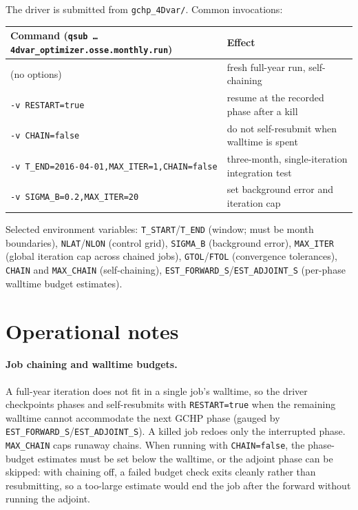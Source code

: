 \documentclass[11pt]{article}
\newcommand{\code}[1]{\texttt{#1}}
\begin{document}
The driver is submitted from \code{gchp\_4Dvar/}. Common invocations:

\begin{center}
\small
\begin{longtable}{@{}p{}p{}@{}}
\toprule
Command (\code{qsub \dots 4dvar\_optimizer.osse.monthly.run}) & Effect \\
\midrule
\endhead
(no options) & fresh full-year run, self-chaining \\
\code{-v RESTART=true} & resume at the recorded phase after a kill \\
\code{-v CHAIN=false} & do not self-resubmit when walltime is spent \\
\code{-v T\_END=2016-04-01,MAX\_ITER=1,CHAIN=false} & three-month, single-iteration integration test \\
\code{-v SIGMA\_B=0.2,MAX\_ITER=20} & set background error and iteration cap \\
\bottomrule
\end{longtable}
\end{center}

\noindent
Selected environment variables: \code{T\_START}/\code{T\_END} (window; must be
month boundaries), \code{NLAT}/\code{NLON} (control grid), \code{SIGMA\_B}
(background error), \code{MAX\_ITER} (global iteration cap across chained jobs),
\code{GTOL}/\code{FTOL} (convergence tolerances), \code{CHAIN} and \code{MAX\_CHAIN}
(self-chaining), \code{EST\_FORWARD\_S}/\code{EST\_ADJOINT\_S} (per-phase walltime
budget estimates).

\section{Operational notes}

\paragraph{Job chaining and walltime budgets.} A full-year iteration does not fit
in a single job's walltime, so the driver checkpoints phases and self-resubmits
with \code{RESTART=true} when the remaining walltime cannot accommodate the next
GCHP phase (gauged by \code{EST\_FORWARD\_S}/\code{EST\_ADJOINT\_S}). A killed job
redoes only the interrupted phase. \code{MAX\_CHAIN} caps runaway chains. When
running with \code{CHAIN=false}, the phase-budget estimates must be set below the
walltime, or the adjoint phase can be skipped: with chaining off, a failed budget
check exits cleanly rather than resubmitting, so a too-large estimate would end the
job after the forward without running the adjoint.
\end{document}
